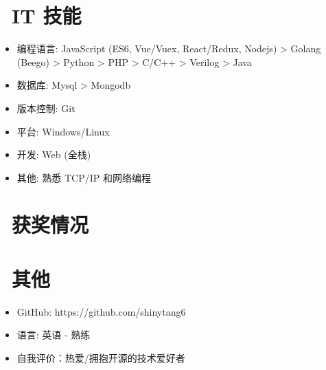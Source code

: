 \documentclass{resume}
\begin{document}

\section{\faCogs\ IT 技能}
\begin{itemize}[parsep=0.5ex]
  \item 编程语言: JavaScript (ES6, Vue/Vuex, React/Redux, Nodejs) > Golang (Beego) > Python > PHP > C/C++ > Verilog > Java
  \item 数据库: Mysql > Mongodb
  \item 版本控制: Git
  \item 平台: Windows/Linux
  \item 开发: Web (全栈)
  \item 其他: 熟悉 TCP/IP 和网络编程
\end{itemize}

\section{\faHeartO\ 获奖情况}


\section{\faInfo\ 其他}
\begin{itemize}[parsep=0.5ex]
  \item GitHub: https://github.com/shinytang6
  \item 语言: 英语 - 熟练
  \item 自我评价：热爱/拥抱开源的技术爱好者
\end{itemize}

%
%
\end{document}
